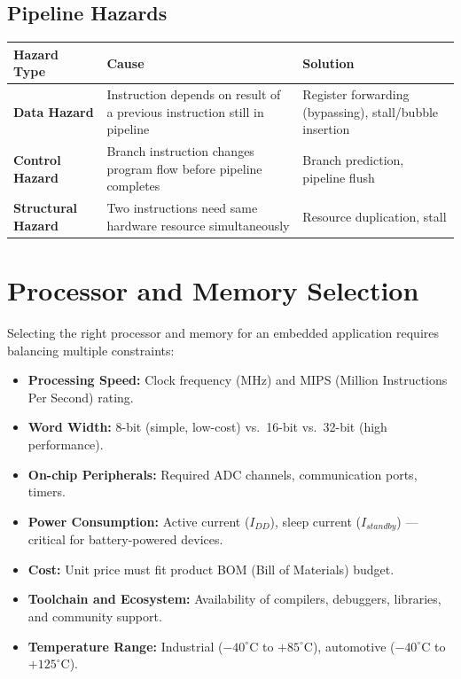 \documentclass[12pt,a4paper]{article}
\renewcommand{\arraystretch}{1.45}
\begin{document}
\subsection{Pipeline Hazards}

\par\noindent
{\renewcommand{\arraystretch}{1.55}%
\begin{tabularx}{\linewidth}{|B{3.0cm}|Y|Y|}
\hline
\textbf{Hazard Type} & \textbf{Cause} & \textbf{Solution} \\
\hline
\textbf{Data Hazard} & Instruction depends on result of a previous instruction still in pipeline & Register forwarding (bypassing), stall/bubble insertion \\
\hline
\textbf{Control Hazard} & Branch instruction changes program flow before pipeline completes & Branch prediction, pipeline flush \\
\hline
\textbf{Structural Hazard} & Two instructions need same hardware resource simultaneously & Resource duplication, stall \\
\hline
\end{tabularx}}

\section{Processor and Memory Selection}

Selecting the right processor and memory for an embedded application requires balancing multiple constraints:

\begin{tcolorbox}[formulabox, title={\textbf{Processor Selection Criteria}}]
\begin{itemize}[leftmargin=*, itemsep=3pt]
  \item \textbf{Processing Speed:} Clock frequency (MHz) and MIPS (Million Instructions Per Second) rating.
  \item \textbf{Word Width:} 8-bit (simple, low-cost) vs.\ 16-bit vs.\ 32-bit (high performance).
  \item \textbf{On-chip Peripherals:} Required ADC channels, communication ports, timers.
  \item \textbf{Power Consumption:} Active current ($I_{DD}$), sleep current ($I_{standby}$) --- critical for battery-powered devices.
  \item \textbf{Cost:} Unit price must fit product BOM (Bill of Materials) budget.
  \item \textbf{Toolchain and Ecosystem:} Availability of compilers, debuggers, libraries, and community support.
  \item \textbf{Temperature Range:} Industrial ($-40^{\circ}$C to $+85^{\circ}$C), automotive ($-40^{\circ}$C to $+125^{\circ}$C).
\end{itemize}
\end{tcolorbox}
\end{document}
